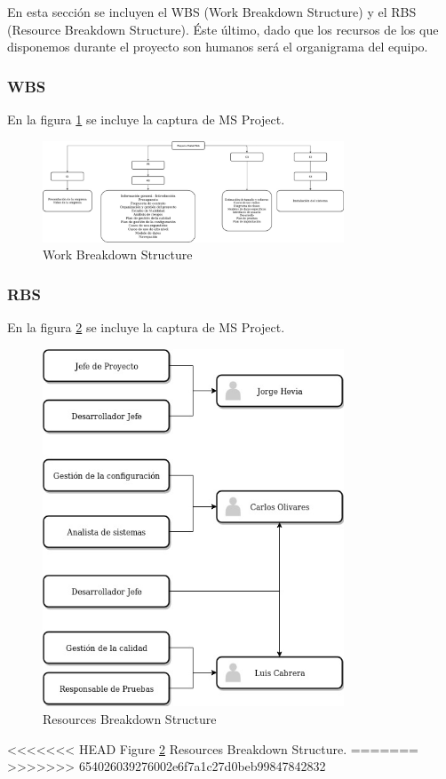 \par En esta sección se incluyen el WBS (Work Breakdown Structure) y el RBS (Resource Breakdown Structure). Éste último, dado que los recursos de los que disponemos durante el proyecto son humanos será el organigrama del equipo.

\subsubsection{WBS}
\par En la figura \ref{fig:wbs} se incluye la captura de MS Project.
\begin{figure}
  \centering
    \includegraphics[width=0.8\textwidth]{img/WBS.jpeg}
  \caption{Work Breakdown Structure}
  \label{fig:wbs}
\end{figure}


\subsubsection{RBS}
\par En la figura \ref{fig:rbs} se incluye la captura de MS Project.
\begin{figure}
  \centering
    \includegraphics[width=0.8\textwidth]{img/RBS.jpeg}
  \caption{Resources Breakdown Structure}
  \label{fig:rbs}
\end{figure}
<<<<<<< HEAD
Figure \ref{fig:rbs} Resources Breakdown Structure.
=======
>>>>>>> 654026039276002e6f7a1c27d0beb99847842832
